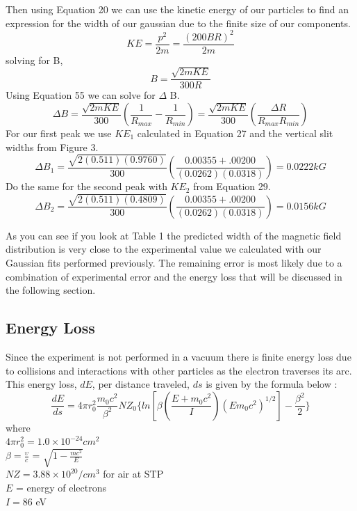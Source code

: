 Then using Equation 20 we can use the kinetic energy of our particles to find an expression for the width of our gaussian due to the finite size of our components. 
\begin{equation}
KE =\frac{ p^{2}}{2m} = \frac{(200BR)^{2}}{2m} 
\end{equation} 
solving for B,
\begin{equation}
B = \frac{\sqrt{2mKE}}{300R}
\end{equation}
Using Equation 55 we can solve for $\Delta$ B.
\begin{equation}
\Delta B = \frac{\sqrt{2mKE}}{300}(\frac{1}{R_{max}}-\frac{1}{R_{min}})= \frac{\sqrt{2mKE}}{300}(\frac{\Delta R}{R_{max}R_{min}})
\end{equation}
For our first peak we use $KE_{1}$ calculated in Equation 27 and the vertical slit widths from Figure 3.
\begin{equation}
\Delta B_{1} = \frac{\sqrt{2(0.511)(0.9760)}}{300}(\frac{0.00355 + .00200}{(0.0262)(0.0318)}) = 0.0222 kG
\end{equation}
Do the same for the second peak with $KE_{2}$ from Equation 29.
\begin{equation}
\Delta B_{2} = \frac{\sqrt{2(0.511)(0.4809)}}{300}(\frac{0.00355 + .00200}{(0.0262)(0.0318)}) = 0.0156 kG
\end{equation}

As you can see if you look at Table 1 the predicted width of the magnetic field distribution is very close to the experimental value we calculated with our Gaussian fits performed previously.  The remaining error is most likely due to a combination of experimental error and the energy loss that will be discussed in the following section. 

\subsection {Energy Loss}
Since the experiment is not performed in a vacuum there is finite energy loss due to collisions and interactions with other particles as the electron traverses its arc.  This energy loss, $dE$, per distance traveled, $ds$ is given by the formula below \cite{bethe}:
\begin{equation}
\frac{dE}{ds} = 4\pi r^{2}_{0} \frac{m_{0}c^{2}}{\beta^{2}} N Z_{0} \{ ln[\beta (\frac{E+m_{0}c^{2}}{I})({E}{m_{0}c^{2}})^{1/2} ] - \frac{\beta^{2}}{2} \} 
\end{equation} 
where\\
$4\pi r_{0}^{2} = 1.0 \times 10^{-24} cm^{2}$\\
$\beta = \frac{\upsilon}{c}$ = $\sqrt{1-\frac{mc^{2}}{E}}$\\
$NZ = 3.88 \times 10^{20} / cm^{3}$ for air at STP\\
$E$ = energy of electrons\\
$I = 86$ eV\\

